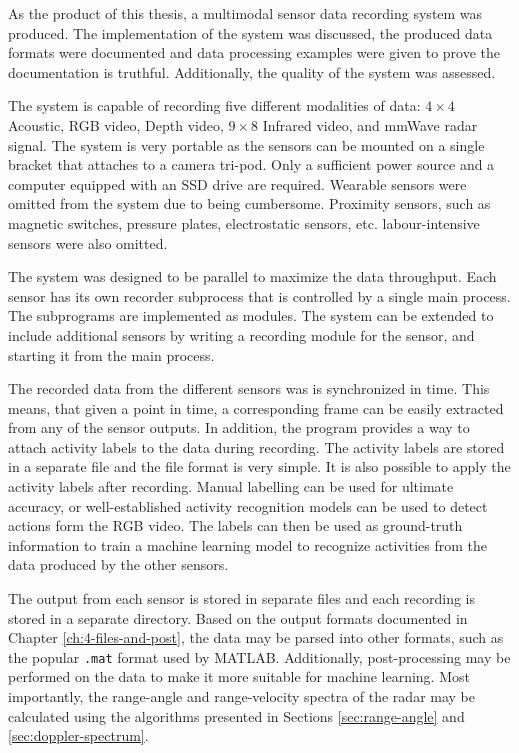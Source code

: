 As the product of this thesis,
a multimodal sensor data recording system was produced.
The implementation of the system was discussed,
the produced data formats were documented and data processing examples were given to prove the documentation is truthful.
Additionally, the quality of the system was assessed.

The system is capable of recording five different modalities of data:
$4 \times 4$ Acoustic, RGB video, Depth video, $9 \times 8$ Infrared video, and mmWave radar signal.
The system is very portable as the sensors can be mounted on a single bracket that attaches to a camera tri-pod.
Only a sufficient power source and a computer equipped with an SSD drive are required.
Wearable sensors were omitted from the system due to being cumbersome.
Proximity sensors, such as magnetic switches, pressure plates, electrostatic sensors, etc. labour-intensive sensors were also omitted.

The system was designed to be parallel to maximize the data throughput.
Each sensor has its own recorder subprocess that is controlled by a single main process.
The subprograms are implemented as modules.
The system can be extended to include additional sensors by writing a recording module for the sensor,
and starting it from the main process.

The recorded data from the different sensors was is synchronized in time.
This means, that given a point in time, a corresponding frame can be easily extracted from any of the sensor outputs.
In addition, the program provides a way to attach activity labels to the data during recording.
The activity labels are stored in a separate file and the file format is very simple.
It is also possible to apply the activity labels after recording.
Manual labelling can be used for ultimate accuracy, or well-established activity recognition models can be used to detect actions form the RGB video.
The labels can then be used as ground-truth information to train a machine learning model to recognize activities from the data produced by the other sensors.

The output from each sensor is stored in separate files and each recording is stored in a separate directory.
Based on the output formats documented in Chapter \ref{ch:4-files-and-post},
the data may be parsed into other formats, such as the popular \texttt{.mat} format used by MATLAB.
Additionally, post-processing may be performed on the data to make it more suitable for machine learning.
Most importantly, the range-angle and range-velocity spectra of the radar may be calculated
using the algorithms presented in Sections \ref{sec:range-angle} and \ref{sec:doppler-spectrum}.

